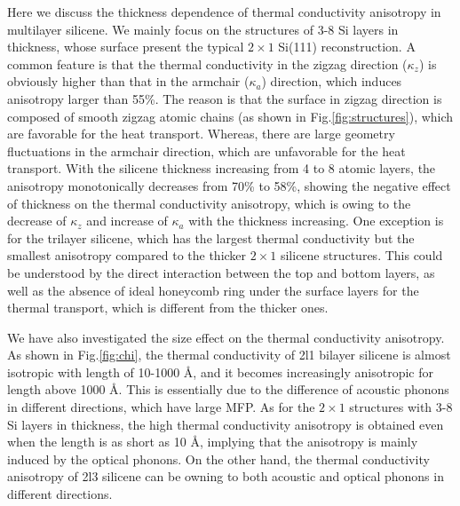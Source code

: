 \documentclass[aps,prb,twocolumn,showpacs,amsmath,amssymb]{revtex4-1}
\newcommand{\angstrom}{\mbox{\normalfont\AA}}
\begin{document}
Here we discuss the thickness dependence of thermal conductivity anisotropy in multilayer silicene. We mainly focus on the structures of 3-8 Si layers in thickness, whose surface present the typical $2 \times 1$ Si(111) reconstruction. A common feature is that the thermal conductivity in the zigzag direction ($\kappa_z$) is obviously higher than that  in the armchair ($\kappa_a$) direction, which induces anisotropy larger than 55\%.
The reason is that the surface in zigzag direction is composed of smooth zigzag atomic chains (as shown in Fig.\ref{fig:structures}), which are favorable for the heat transport. Whereas,  there are large geometry fluctuations in the armchair direction, which are unfavorable for the heat transport.
With the silicene thickness increasing from 4 to 8 atomic layers, the anisotropy monotonically decreases from 70\% to 58\%, showing the negative  effect of thickness on the thermal conductivity anisotropy, which  is owing to the decrease of $\kappa_z$ and increase of $\kappa_a$  with the  thickness increasing.
One exception is for the trilayer silicene, which has the largest thermal conductivity but the smallest  anisotropy compared to the thicker  $2\times1$ silicene structures.  This could be understood by the direct interaction between the top and bottom layers, as well as the absence of ideal honeycomb ring under the surface layers  for the thermal transport, which is different from the thicker ones\cite{Guo2015Structural}.

We have also investigated the size effect on the thermal conductivity anisotropy. As shown in Fig.\ref{fig:chi}, the thermal conductivity of  2l1 bilayer silicene is almost isotropic with length of 10-1000 \angstrom, and it becomes increasingly anisotropic for length  above 1000  \angstrom. This is essentially due to the difference of acoustic phonons in different directions,  which have large MFP.  As for the $2\times1$ structures with 3-8 Si layers in thickness, the high thermal conductivity anisotropy is obtained even when the length is as short as 10 \angstrom, implying that the anisotropy is  mainly induced by the optical phonons. On the other hand, the thermal conductivity anisotropy of 2l3 silicene can be owning to both acoustic and  optical phonons in different directions.
\end{document}
